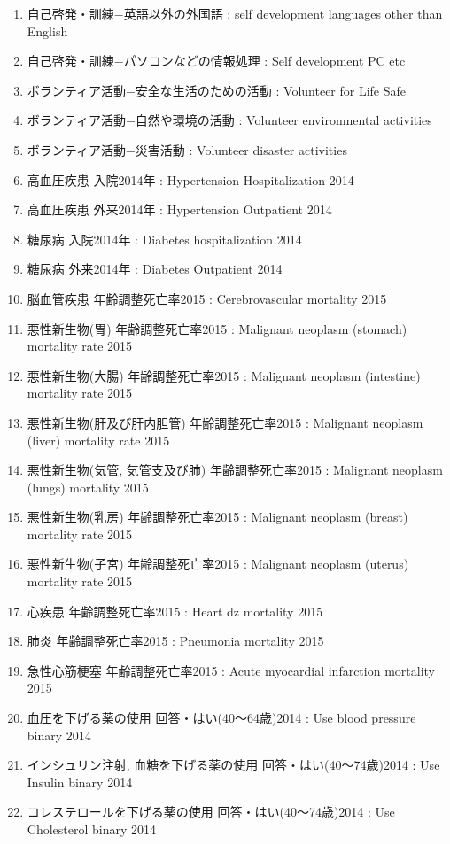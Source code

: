 \begin{multicols}{2}
\begin{enumerate}
  \item 自己啓発・訓練−英語以外の外国語  :  self development languages other than English
  \item 自己啓発・訓練−パソコンなどの情報処理  :  Self development PC etc
  \item ボランティア活動−安全な生活のための活動  :  Volunteer for Life Safe
  \item ボランティア活動−自然や環境の活動  :  Volunteer environmental activities
  \item ボランティア活動−災害活動  :  Volunteer disaster activities
  \item 高血圧疾患 入院2014年  :  Hypertension Hospitalization 2014
  \item 高血圧疾患 外来2014年  :  Hypertension Outpatient 2014
  \item 糖尿病 入院2014年  :  Diabetes hospitalization 2014
  \item 糖尿病 外来2014年  :  Diabetes Outpatient 2014
  \item 脳血管疾患 年齢調整死亡率2015  :  Cerebrovascular mortality 2015
  \item 悪性新生物(胃) 年齢調整死亡率2015  :  Malignant neoplasm (stomach) mortality rate 2015
  \item 悪性新生物(大腸) 年齢調整死亡率2015  :  Malignant neoplasm (intestine) mortality rate 2015
  \item 悪性新生物(肝及び肝内胆管) 年齢調整死亡率2015  :  Malignant neoplasm (liver) mortality rate 2015
  \item 悪性新生物(気管, 気管支及び肺) 年齢調整死亡率2015  :  Malignant neoplasm (lungs) mortality 2015
  \item 悪性新生物(乳房) 年齢調整死亡率2015  :  Malignant neoplasm (breast) mortality rate 2015
  \item 悪性新生物(子宮) 年齢調整死亡率2015  :  Malignant neoplasm (uterus) mortality rate 2015
  \item 心疾患 年齢調整死亡率2015  :  Heart dz mortality 2015
  \item 肺炎 年齢調整死亡率2015  :  Pneumonia mortality 2015
  \item 急性心筋梗塞 年齢調整死亡率2015  :  Acute myocardial infarction mortality 2015
  \item 血圧を下げる薬の使用 回答・はい(40〜64歳)2014  :  Use blood pressure binary 2014
  \item インシュリン注射, 血糖を下げる薬の使用 回答・はい(40〜74歳)2014  :  Use Insulin binary 2014
  \item コレステロールを下げる薬の使用 回答・はい(40〜74歳)2014  :  Use Cholesterol binary 2014

\end{enumerate}
\end{multicols}
